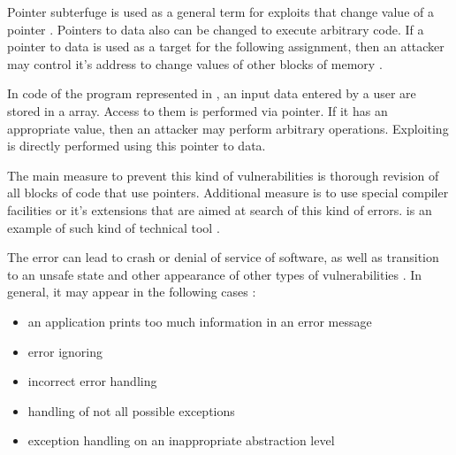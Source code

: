 %
Pointer subterfuge is used as a general term for exploits that change value of a pointer . 
%
Pointers to data also can be changed to execute arbitrary code. 
%
If a pointer to data is used as a target for the following assignment, then an attacker may control it's address to change values of other blocks of memory . 

%
In code of the program represented in , an input data entered by a user are stored in a array. 
%
Access to them is performed via  pointer. 
%
If it has an appropriate value, then an attacker may perform arbitrary operations. 
%
Exploiting is directly performed using this pointer to data. 

%
The main measure to prevent this kind of vulnerabilities is thorough revision of all blocks of code that use pointers. 
%
Additional measure is to use special compiler facilities or it's extensions that are aimed at search of this kind of errors. 
%
 is an example of such kind of technical tool . 



%
The error can lead to crash or denial of service of software, as well as transition to an unsafe state and other appearance of other types of vulnerabilities  . 
%
In general, it may appear in the following cases :
\begin{itemize}
	\item an application prints too much information in an error message
	\item error ignoring
	\item incorrect error handling
	\item handling of not all possible exceptions
	\item exception handling on an inappropriate abstraction level
\end{itemize}

